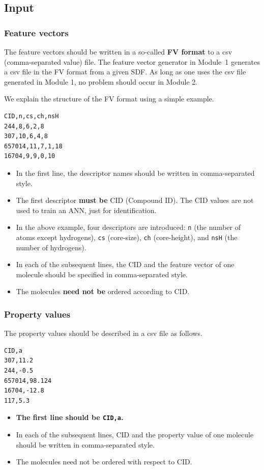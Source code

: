 \documentclass[11pt,titlepage,dvipdfmx,twoside]{book}
\begin{document}
\subsection{Input}
\subsubsection{Feature vectors}
The feature vectors should be written in
a so-called {\bf FV format} to
a csv (comma-separated value) file. 
%
The feature vector generator in Module~1
generates a csv file in the FV format
from a given SDF.
As long as one uses the csv file generated in Module 1,
no problem should occur in Module 2. 

We explain the structure of the FV format using a simple example.  
\begin{oframed}
  {\small
\begin{verbatim}
CID,n,cs,ch,nsH
244,8,6,2,8
307,10,6,4,8
657014,11,7,1,18
16704,9,9,0,10
\end{verbatim}
}
\end{oframed}
\begin{itemize}
\item In the first line, the descriptor names should be written in comma-separated style.  
\item The first descriptor {\bf must be} CID (Compound ID).
  The CID values are not used to train an ANN, just for identification. 
\item In the above example,
  four descriptors are introduced: 
  \verb|n| (the number of atoms except hydrogens),
  \verb|cs| (core-size),
  \verb|ch| (core-height), and
  \verb|nsH| (the number of hydrogens). 
\item In each of the subsequent lines,
  the CID and the feature vector of one molecule
  should be specified in comma-separated style. 
\item The molecules {\bf need not be} ordered according to CID. 
\end{itemize}


\subsubsection{Property values}
The property values should be described in a csv file as follows.  
\begin{oframed}
  {\small
\begin{verbatim}
CID,a
307,11.2
244,-0.5
657014,98.124
16704,-12.8
117,5.3
\end{verbatim}
}
\end{oframed}
\begin{itemize}
\item {\bf The first line should be \verb|CID,a|. }
\item In each of the subsequent lines,
  CID and the property value of one molecule
  should be written in comma-separated style. 
\item The molecules need not be ordered with respect to CID. 
\end{itemize}
  
\end{document}
